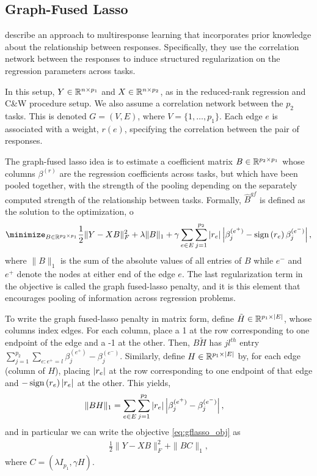 \documentclass{article}
\begin{document}
\subsection{Graph-Fused Lasso}
\label{subsec:graph_fused_lasso}

\citep{chen2010graph} describe an approach to multiresponse learning that
incorporates prior knowledge about the relationship between responses.
Specifically, they use the correlation network between the responses to induce
structured regularization on the regression parameters across tasks.

In this setup, $Y \in \mathbb{R}^{n \times p_{1}}$ and $X \in \mathbb{R}^{n \times
  p_{2}}$, as in the reduced-rank regression and C\&W procedure setup. We also
assume a correlation network between the $p_{2}$ tasks. This is denoted $G =
\left(V, E\right)$, where $V = \{1, \dots, p_{1}\}$. Each edge $e$ is associated
with a weight, $r\left(e\right)$, specifying the correlation between the pair of
responses.

The graph-fused lasso idea is to estimate a coefficient matrix $B \in
\mathbb{R}^{p_{2} \times p_{1}}$ whose columns $\beta^{(r)}$ are the regression
coefficients across tasks, but which have been pooled together, with the
strength of the pooling depending on the separately computed strength of the
relationship between tasks. Formally, $\hat{B}^{gf}$ is defined as the solution
to the optimization,
o\begin{align}
\minimize_{B \in \reals^{p_{2} \times p_{1}}} \frac{1}{2}\|Y -
  XB\|_{F}^{2} + \lambda \|B\|_{1} + \gamma \sum_{e \in E} \sum_{j =
    1}^{p_{2}} \absarg{r_{e}}\absarg{\beta_{j}^{(e^{+})} -
      \sign\left(r_{e}\right) \beta^{(e^{-})}_{j}}, \label{eq:gflasso_obj}
\end{align}
where $\|B\|_{1}$ is the sum of the absolute values of all entries of $B$ while
$e^{-}$ and $e^{+}$ denote the nodes at either end of the edge $e$. The last
regularization term in the objective is called the graph fused-lasso penalty,
and it is this element that encourages pooling of information across regression
problems.

To write the graph fused-lasso penalty in matrix form, define $\tilde{H} \in
\mathbb{R}^{p_{1} \times \left|E\right|}$, whose columns index edges. For each column,
place a 1 at the row corresponding to one endpoint of the edge and a -1 at the
other. Then, $B\tilde{H}$ has $jl^{th}$ entry $\sum_{j = 1}^{p_{2}} \sum_{e :
  e^{+} = l}\beta_{j}^{(e^{+})} - \beta_{j}^{(e^{-})}$. Similarly, define $H \in
\mathbb{R}^{p_{1} \times \left|E\right|}$ by, for each edge (column of $H$), placing
$\left|r_{e}\right|$ at the row corresponding to one endpoint of that edge and
$-\mathop\mathrm{sign}\left(r_{e}\right)\left|r_{e}\right|$ at the other. This yields,
\begin{align*}
\|BH\|_{1} &= \sum_{e \in E}\sum_{j = 1}^{p_{2}}
\left|r_{e}\right|\left|\beta_{j}^{(e^{+})} - \beta_{j}^{(e^{-})}\right|,
\end{align*}
and in particular we can write the objective \ref{eq:gflasso_obj} as
\begin{align}
  \frac{1}{2}\|Y - XB\|_{F}^{2} + \|BC\|_{1}, \label{eq:gflasso_reform}
\end{align}
where $C = \left(\lambda I_{p_{1}}, \gamma H\right)$.
\end{document}
